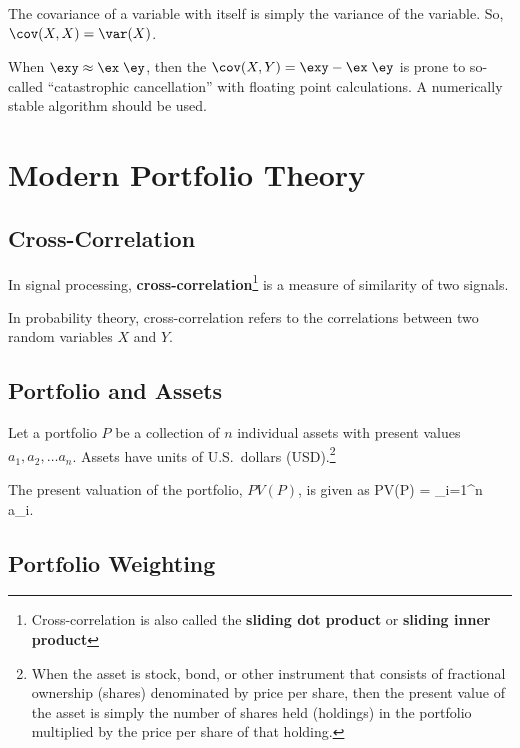 \begin{Hremark}
	The covariance of a variable with itself is simply the variance
	of the variable.  So, $\cov(X, X) = \var(X)$.
\end{Hremark}

\begin{Hremark}
	When $\exy \approx \ex \; \ey$, then the $\cov(X,Y) = \exy - \ex \; \ey$ 
	is prone to so-called ``catastrophic cancellation'' with floating point
	calculations.  A numerically stable algorithm should be used.
\end{Hremark}

\chapter{Modern Portfolio Theory}

\section{Cross-Correlation}
In signal processing, {\bf cross-correlation}\footnote{Cross-correlation is
also called the {\bf sliding dot product} or {\bf sliding inner product}}
is a measure of similarity of two signals.  

In probability theory, cross-correlation refers to the correlations between
two random variables $X$ and $Y$.


\section{Portfolio and Assets}

Let a portfolio $P$ be a collection of $n$ individual assets 
with present values $a_1, a_2, \ldots a_n$.
Assets have units of 
U.S.~dollars (USD).\footnote{When the asset is stock, bond, or 
other instrument that consists of 
fractional ownership (shares) denominated by price per share, 
then the present value of the asset is simply the number of shares
held (holdings) in the portfolio multiplied by the price per share of that
holding.}

The present valuation of the portfolio, $PV(P)$, is given as
\be
 PV(P) = \sum_{i=1}^n a_i.
\ee

\section{Portfolio Weighting}

